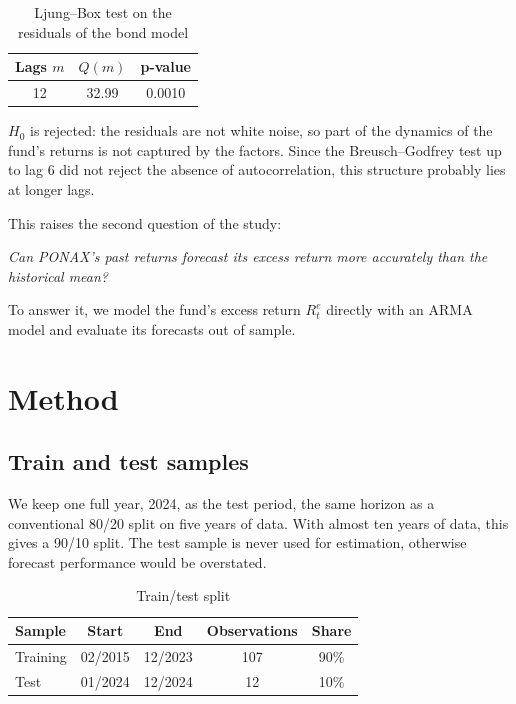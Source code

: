 \documentclass[11pt,a4paper]{article}
\begin{document}
\begin{table}[H]
\centering
\caption{Ljung--Box test on the residuals of the bond model}
\small
\begin{tabular}{ccc}
\toprule
Lags $m$ & $Q(m)$ & p-value \\
\midrule
12 & 32.99 & 0.0010 \\
\bottomrule
\end{tabular}
\end{table}

$H_0$ is rejected: the residuals are not white noise, so part of the dynamics of the fund's returns is not captured by the factors. Since the Breusch--Godfrey test up to lag 6 did not reject the absence of autocorrelation, this structure probably lies at longer lags.

This raises the second question of the study:
\begin{center}
\emph{Can PONAX's past returns forecast its excess return more accurately than the historical mean?}
\end{center}
To answer it, we model the fund's excess return $R^e_t$ directly with an ARMA model and evaluate its forecasts out of sample.

\section{Method}

\subsection{Train and test samples}

We keep one full year, 2024, as the test period, the same horizon as a conventional 80/20 split on five years of data. With almost ten years of data, this gives a 90/10 split. The test sample is never used for estimation, otherwise forecast performance would be overstated.

\begin{table}[H]
\centering
\caption{Train/test split}
\small
\begin{tabular}{lcccc}
\toprule
Sample & Start & End & Observations & Share \\
\midrule
Training & 02/2015 & 12/2023 & 107 & 90\% \\
Test & 01/2024 & 12/2024 & 12 & 10\% \\
\bottomrule
\end{tabular}
\end{table}
\end{document}
